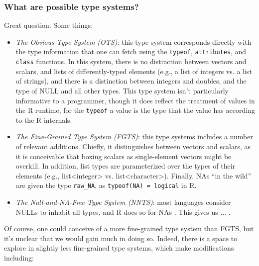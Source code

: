 \documentclass[acmsmall,10pt,review,anonymous]{acmart}\settopmatter{printfolios=true,printccs=false,printacmref=false}
\begin{document}
%
%
\subsubsection{What are possible type systems?}

Great question.
Some things:

\begin{itemize}

\item {\it The Obvious Type System (OTS)}: this type system corresponds directly with the type information that one can fetch using the {\tt typeof}, {\tt attributes}, and {\tt class} functions.
In this system, there is no distinction between vectors and scalars, and lists of differently-typed elements (e.g., a list of integers vs. a list of strings), and there is a distinction between integers and doubles, and the type of NULL and all other types.
This type system isn't particularly informative to a programmer, though it does reflect the treatment of values in the R runtime, for the {\tt typeof} a value is the type that the value has according to the R internals.

\item {\it The Fine-Grained Type System (FGTS)}: this type systems includes a number of relevant additions.
Chiefly, it distinguishes between vectors and scalars, as it is conceivable that boxing scalars as single-element vectors might be overkill.
In addition, list types are parameterized over the types of their elements (e.g., list<integer> vs. list<character>).
Finally, NAs ``in the wild'' are given the type {\tt raw\_NA}, as {\tt typeof(NA) = logical} in R.

\item {\it The Null-and-NA-Free Type System (NNTS)}: most languages consider NULLs to inhabit all types, and R does so for NAs .
This gives us ... .

\end{itemize}

Of course, one could conceive of a more fine-grained type system than FGTS, but it's unclear that we would gain much in doing so.
Indeed, there is a space to explore in slightly less fine-grained type systems, which make modifications including:
\end{document}
